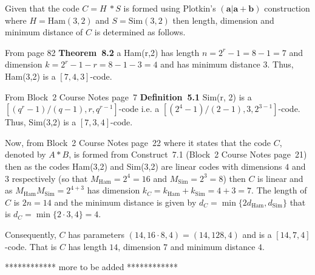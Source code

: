 Given that the code $C = H\ * S$ is formed using Plotkin's $(\bm{a}|\bm{a} + \bm{b})$ construction where $H =\textrm{Ham}(3,2)$ and $S =\textrm{Sim}(3,2)$ then length, dimension and minimum distance of $C$ is determined as follows.

From \hill page 82 \textbf{Theorem~8.2} a Ham(r,2) has length $n=2^r - 1 = 8-1=7$ and dimension $k = 2^r-1-r = 8-1-3=4$ and has minimum distance $3$. Thus, Ham(3,2) is a $[7, 4, 3]$-code.

From Block~2 Course Notes page~7 \textbf{Definition~5.1} Sim(r, 2) is a $[(q^r-1)/(q-1),r,q^{r-1}]$-code i.e. a $[(2^4-1)/(2-1),3,2^{3-1}]$-code. Thus, Sim(3,2) is a 
$[7,3,4]$-code.

Now, from Block~2 Course Notes page~22 where it states that the code $C$, denoted by $A*B$, is formed from Construct~7.1 (Block~2 Course Notes page~21) then as the codes Ham(3,2) and Sim(3,2) are linear codes with dimensions $4$ and $3$ respectively (so that $M_{\textrm{Ham}}=2^4=16$ and $M_{\textrm{Sim}}=2^3=8$) then $C$ is linear and as $M_{\textrm{Ham}}M_{\textrm{Sim}}=2^{4+3}$ has dimension $k_C = k_{\textrm{Ham}} + k_{\textrm{Sim}} = 4 + 3 = 7$. The length of $C$ is $2n=14$ and the minimum distance is given by $d_C=\min\{2d_{\textrm{Ham}},d_{\textrm{Sim}}\}$ that is $d_C=\min\{2\cdot3,4\} = 4$. 

Consequently, $C$ has parameters $(14, 16\cdot8, 4)=(14, 128, 4)$ and is a $[14,7,4]$-code. That is $C$ has length $14$, dimension $7$ and minimum distance $4$.

************ more to be added ************